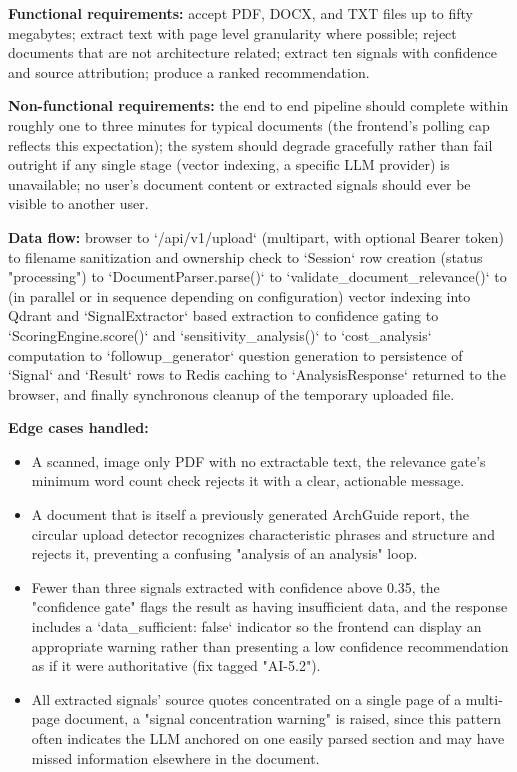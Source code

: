 \documentclass[11pt,a4paper]{report}
\begin{document}
\textbf{Functional requirements:} accept PDF, DOCX, and TXT files up to fifty megabytes; extract text with page level granularity where possible; reject documents that are not architecture related; extract ten signals with confidence and source attribution; produce a ranked recommendation.

\textbf{Non-functional requirements:} the end to end pipeline should complete within roughly one to three minutes for typical documents (the frontend's polling cap reflects this expectation); the system should degrade gracefully rather than fail outright if any single stage (vector indexing, a specific LLM provider) is unavailable; no user's document content or extracted signals should ever be visible to another user.

\textbf{Data flow:} browser to `/api/v1/upload` (multipart, with optional Bearer token) to filename sanitization and ownership check to `Session` row creation (status "processing") to `DocumentParser.parse()` to `validate_document_relevance()` to (in parallel or in sequence depending on configuration) vector indexing into Qdrant and `SignalExtractor` based extraction to confidence gating to `ScoringEngine.score()` and `sensitivity_analysis()` to `cost_analysis` computation to `followup_generator` question generation to persistence of `Signal` and `Result` rows to Redis caching to `AnalysisResponse` returned to the browser, and finally synchronous cleanup of the temporary uploaded file.

\textbf{Edge cases handled:}
\begin{itemize}[leftmargin=*]
  \item A scanned, image only PDF with no extractable text, the relevance gate's minimum word count check rejects it with a clear, actionable message.
  \item A document that is itself a previously generated ArchGuide report, the circular upload detector recognizes characteristic phrases and structure and rejects it, preventing a confusing "analysis of an analysis" loop.
  \item Fewer than three signals extracted with confidence above 0.35, the "confidence gate" flags the result as having insufficient data, and the response includes a `data_sufficient: false` indicator so the frontend can display an appropriate warning rather than presenting a low confidence recommendation as if it were authoritative (fix tagged "AI-5.2").
  \item All extracted signals' source quotes concentrated on a single page of a multi-page document, a "signal concentration warning" is raised, since this pattern often indicates the LLM anchored on one easily parsed section and may have missed information elsewhere in the document.
\end{itemize}
\end{document}
